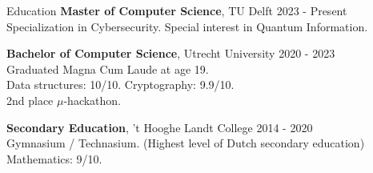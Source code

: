 \documentclass{resume} %
\begin{document}

%
%
%

\begin{rSection}{Education}
{\bf Master of Computer Science}, TU Delft \hfill {2023 - Present}\\
Specialization in Cybersecurity. Special interest in Quantum Information.

{\bf Bachelor of Computer Science}, Utrecht University \hfill {2020 - 2023}\\
Graduated Magna Cum Laude at age 19.\\
Data structures: 10/10. Cryptography: 9.9/10.\\
2nd place $\mu$-hackathon.

{\bf Secondary Education}, 't Hooghe Landt College \hfill {2014 - 2020}\\
Gymnasium / Technasium. (Highest level of Dutch secondary education)\\
Mathematics: 9/10.


\end{rSection}
\end{document}
